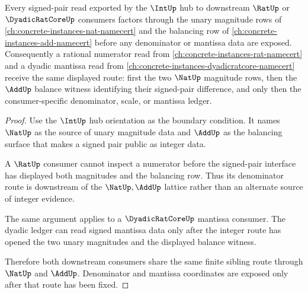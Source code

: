 \begin{theorem}\label{thm:int-signed-pair-lattice-sibling-route}
Every signed-pair read exported by the $\IntUp$ hub to downstream $\RatUp$ or $\DyadicRatCoreUp$ consumers factors through the unary magnitude rows of \autoref{ch:concrete-instances-nat-namecert} and the balancing row of \autoref{ch:concrete-instances-add-namecert} before any denominator or mantissa data are exposed. Consequently a rational numerator read from \autoref{ch:concrete-instances-rat-namecert} and a dyadic mantissa read from \autoref{ch:concrete-instances-dyadicratcore-namecert} receive the same displayed route: first the two $\NatUp$ magnitude rows, then the $\AddUp$ balance witness identifying their signed-pair difference, and only then the consumer-specific denominator, scale, or mantissa ledger.
\end{theorem}
\begin{proof}
Use the $\IntUp$ hub orientation as the boundary condition. It names $\NatUp$ as the source of unary magnitude data and $\AddUp$ as the balancing surface that makes a signed pair public as integer data.

A $\RatUp$ consumer cannot inspect a numerator before the signed-pair interface has displayed both magnitudes and the balancing row. Thus its denominator route is downstream of the $\NatUp,\AddUp$ lattice rather than an alternate source of integer evidence.

The same argument applies to a $\DyadicRatCoreUp$ mantissa consumer. The dyadic ledger can read signed mantissa data only after the integer route has opened the two unary magnitudes and the displayed balance witness.

Therefore both downstream consumers share the same finite sibling route through $\NatUp$ and $\AddUp$. Denominator and mantissa coordinates are exposed only after that route has been fixed.
\end{proof}
